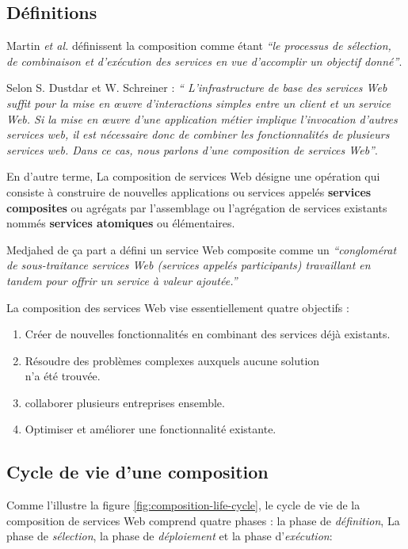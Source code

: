   \subsection{Définitions}
  \label{sec:definitions}
  Martin \emph{et al.} \cite{martin2004owl} définissent la composition
  comme étant \emph{``le processus de sélection, de combinaison et
    d'exécution des services en vue d'accomplir un objectif
    donné''}.\bigskip

  Selon S. Dustdar et W. Schreiner \cite{dustdar2005survey} : \emph{``
    L'infrastructure de base des services Web suffit pour la mise en
    œuvre d'interactions simples entre un client et un service Web. Si
    la mise en œuvre d'une application métier implique l'invocation
    d'autres services web, il est nécessaire donc de combiner les
    fonctionnalités de plusieurs services web. Dans ce cas, nous
    parlons d'une composition de services Web''}.\bigskip

  En d'autre terme, La composition de services Web désigne une
  opération qui consiste à construire de nouvelles applications ou
  services appelés \textbf{services composites} ou agrégats par
  l'assemblage ou l'agrégation de services existants nommés
  \textbf{services atomiques} ou élémentaires.\bigskip

  Medjahed \cite{medjahed2004thesis} de ça part a défini un service
  Web composite comme un \emph{``conglomérat de sous-traitance
    services Web (services appelés participants) travaillant en tandem
    pour offrir un service à valeur ajoutée.''}\bigskip

  La composition des services Web vise essentiellement quatre objectifs
  \cite{driss2011approche}:

  \begin{enumerate}
  \item Créer de nouvelles fonctionnalités en combinant des services
    déjà existants.
  \item Résoudre des problèmes complexes auxquels aucune solution\\
    n'a été trouvée.
  \item collaborer plusieurs entreprises ensemble.
  \item Optimiser et améliorer une fonctionnalité existante.
  \end{enumerate}

  \subsection{Cycle de vie d'une composition }
  \label{sec:cycle-de-vie}
  Comme l'illustre la figure \ref{fig:composition-life-cycle}, le
  cycle de vie de la composition de services Web comprend quatre
  phases \cite{sheng2014web}: la phase de \textit{définition}, La
  phase de \textit{sélection}, la phase de \textit{déploiement} et la
  phase d'\textit{exécution}:


